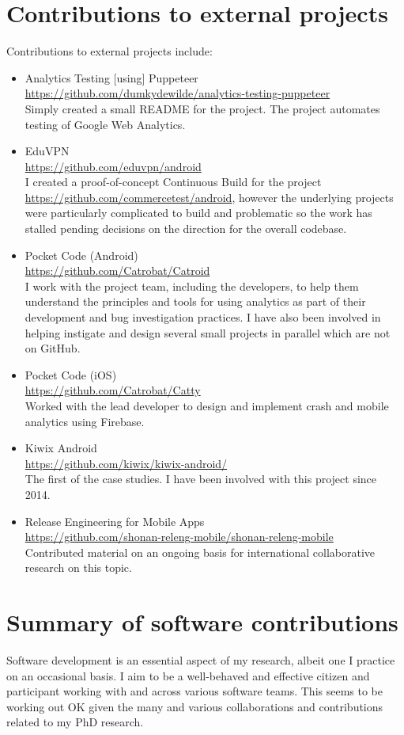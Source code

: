 \section{Contributions to external projects}
Contributions to external projects include:
\begin{itemize}
    \item Analytics Testing [using] Puppeteer\\ \url{https://github.com/dumkydewilde/analytics-testing-puppeteer}\\ Simply created a small README for the project. The project automates testing of Google Web Analytics.
    
    \item EduVPN\\
    \url{https://github.com/eduvpn/android}\\
    I created a proof-of-concept Continuous Build for the project \url{https://github.com/commercetest/android}, however the underlying projects were particularly complicated to build and problematic so the work has stalled pending decisions on the direction for the overall codebase.
    
    \item Pocket Code (Android)\\
    \url{https://github.com/Catrobat/Catroid}\\
    I work with the project team, including the developers, to help them understand the principles and tools for using analytics as part of their development and bug investigation practices. I have also been involved in helping instigate and design several small projects in parallel which are not on GitHub.
    
    \item Pocket Code (iOS)\\
    \url{https://github.com/Catrobat/Catty}\\
    Worked with the lead developer to design and implement crash and mobile analytics using Firebase.
    
    \item Kiwix Android\\
    \url{https://github.com/kiwix/kiwix-android/}\\
    The first of the case studies. I have been involved with this project since 2014.

    \item Release Engineering for Mobile Apps\\ \url{https://github.com/shonan-releng-mobile/shonan-releng-mobile}\\ Contributed material on an ongoing basis for international collaborative research on this topic. 
\end{itemize}

\section{Summary of software contributions}
Software development is an essential aspect of my research, albeit one I practice on an occasional basis. I aim to be a well-behaved and effective citizen and participant working with and across various software teams. This seems to be working out OK given the many and various collaborations and contributions related to my PhD research.
